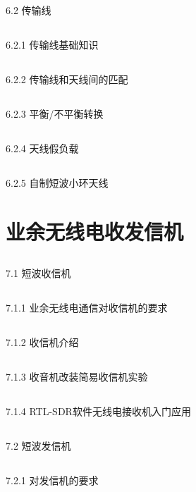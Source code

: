 \documentclass[12pt,UTF8]{ctexbook}
\begin{document}
\section{}6.2 传输线
\section{}6.2.1 传输线基础知识
\section{}6.2.2 传输线和天线间的匹配
\section{}6.2.3 平衡/不平衡转换
\section{}6.2.4 天线假负载
\section{}6.2.5 自制短波小环天线

\chapter{业余无线电收发信机}

\section{}7.1 短波收信机
\section{}7.1.1 业余无线电通信对收信机的要求
\section{}7.1.2 收信机介绍
\section{}7.1.3 收音机改装简易收信机实验
\section{}7.1.4 RTL-SDR软件无线电接收机入门应用
\section{}7.2 短波发信机
\section{}7.2.1 对发信机的要求
\end{document}
